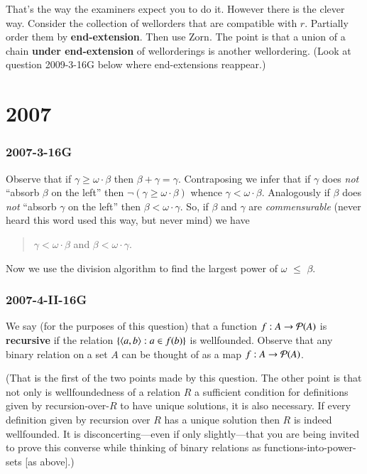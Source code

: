 \documentclass{book}
\begin{document}
\smallskip

That's the way the examiners expect you to do it.  However there is
the clever way.  Consider the collection of wellorders that are
compatible with $r$.  Partially order them by {\bf end-extension}.
Then use Zorn.  The point is that a union of a chain {\bf under
  end-extension} of wellorderings is another wellordering. (Look at
question {2009-3-16G} below where end-extensions reappear.)

\chapter{2007}
\subsection*{2007-3-16G}

Observe that if $\gamma \geq \omega \cdot \beta$ then $\beta + \gamma
= \gamma$.  Contraposing we infer that if $\gamma$ does {\sl not}
``absorb $\beta$ on the left'' then $\neg(\gamma \geq \omega \cdot
\beta)$ whence $\gamma < \omega \cdot \beta$.  Analogously if $\beta$
does {\sl not} ``absorb $\gamma$ on the left'' then $\beta < \omega
\cdot \gamma$.  So, if $\beta$ and $\gamma$ are {\sl commensurable}
(never heard this word used this way, but never mind) we have
\begin{quote}
$\gamma < \omega \cdot \beta$ and $\beta< \omega \cdot \gamma$.\end{quote}

Now we use the division algorithm to find the largest power of $\omega$ 
$\leq$ $\beta$.

\subsection*{2007-4-II-16G}

We say (for the purposes of this question) that a function $f:A \to
{\cal P}(A)$ is {\bf recursive} if the relation $\{\mbox{$\langle a,b \rangle$}: a \in
f(b)\}$ is wellfounded.  Observe that any binary relation on a set $A$
can be thought of as a map $f:A \to {\cal P}(A)$.  

(That is the first of the two points made by this question. The other
point is that not only is wellfoundedness of a relation $R$ a
sufficient condition for definitions given by recursion-over-$R$ to
have unique solutions, it is also necessary.  If every definition
given by recursion over $R$ has a unique solution then $R$ is indeed
wellfounded.  It is disconcerting---even if only slightly---that you
are being invited to prove this converse while thinking of binary
relations as functions-into-power-sets [as above].)
\end{document}
